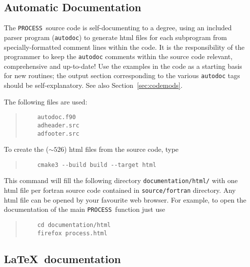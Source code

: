 \documentclass[11pt,a4paper]{report}
\newcommand{\process}{\mbox{\texttt{PROCESS}}}
\begin{document}
\subsection{Automatic Documentation}
\label{sec:autodoc}

The \process\ source code is self-documenting to a degree, using an included
parser program (\texttt{autodoc}) to generate html files for each subprogram
from specially-formatted comment lines within the code. It is the
responsibility of the programmer to keep the \texttt{autodoc} comments within
the source code relevant, comprehensive and up-to-date! Use the examples in
the code as a starting basis for new routines; the output section
corresponding to the various \texttt{autodoc} tags should be
self-explanatory. See also Section~\ref{sec:codemods}.

The following files are used:

\begin{quote}
	\begin{verbatim}
	autodoc.f90
	adheader.src
	adfooter.src
	\end{verbatim}
\end{quote}


To create the ($\sim 526$) html files from the source code, type

\begin{quote}
	\begin{verbatim}
	cmake3 --build build --target html
	\end{verbatim}
\end{quote}

This command will fill the following directory \texttt{documentation/html/} with one html file per fortran source code contained in \texttt{source/fortran} directory. Any html file can be opened by your favourite web browser. For example, to open the documentation of the main \process\ function just use

\begin{quote}
	\begin{verbatim}
	cd documentation/html
	firefox process.html
	\end{verbatim}
\end{quote}

\subsection{\LaTeX\ documentation}
\label{sec:tex_doc}
\end{document}
